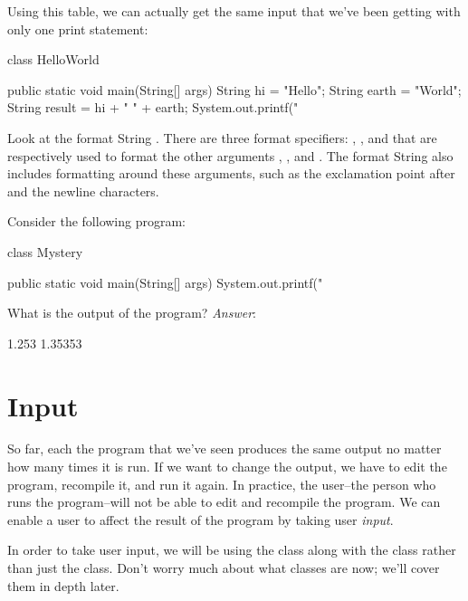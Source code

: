 Using this table, we can actually get the same input that we've been getting
with only one print statement:
\begin{code}
class HelloWorld {

    public static void main(String[] args) {
        String hi = "Hello";
        String earth = "World";
        String result = hi + " " + earth;
        System.out.printf("%
    }

}
\end{code}
Look at the format String . There are three format
specifiers: , , and  that are respectively
used to format the other arguments , , and .
The format String also includes formatting around these arguments, such
as the exclamation point after  and the newline characters.
 
\begin{example}
Consider the following program:
\begin{code}
class Mystery {

    public static void main(String[] args) {
        System.out.printf("%
    }

}
\end{code}
What is the output of the program?
\noindent \emph{Answer}:
\begin{code}
1.253
1.35353
\end{code}
\end{example}

\section{Input}
So far, each the program that we've seen produces the same output no
matter how many times it is run. If we want to change the output,
we have to edit the program, recompile it, and run it again.
In practice, the user--the person who runs the program--will
not be able to edit and recompile the program.
We can enable a user to affect the result of the program
by taking user \emph{input}.

In order to take user input, we will be using the  class
along with the  class
rather than just the  class.
Don't worry much about what classes are now; we'll cover
them in depth later.

